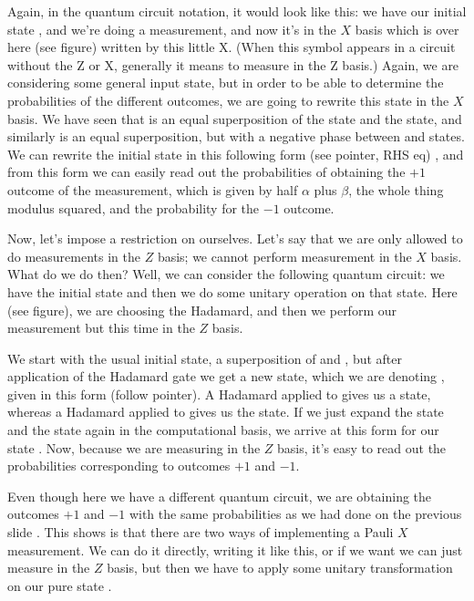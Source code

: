 Again, in the quantum circuit notation, it would look like this: we have our initial state \ket{\psi}, and we're doing a measurement, and now it's in the $X$ basis which is over here (see figure) written by this little X.  (When this symbol appears in a circuit without the Z or X, generally it means to measure in the Z basis.) Again, we are considering some general input state, but in order to be able to determine the probabilities of the different outcomes, we are going to rewrite this state in the $X$ basis. We have seen that  is an equal superposition of the \ket{+} state and the \ket{-} state, and similarly  is an equal superposition, but with a negative phase between \ket{+} and \ket{-} states. We can rewrite the initial state in this following form (see pointer, RHS eq) \rdv{}, and from this form we can easily read out the probabilities of obtaining the  $+1$ outcome of the measurement, which is given by half $\alpha$ plus $\beta$, the whole thing modulus squared, and the probability for the  $-1$ outcome.

Now, let's impose a restriction on ourselves. Let's say that we are only allowed to do measurements in the $Z$ basis; we cannot perform measurement in the $X$ basis.  What do we do then? Well, we can consider the following quantum circuit: we have the initial state and then we do some unitary operation on that state. Here (see figure), we are choosing the Hadamard, and then we perform our measurement but this time in the $Z$ basis.


We start with the usual initial state, a superposition of  and , but after application of the Hadamard gate we get a new state, which we are denoting , given in this form (follow pointer). A Hadamard applied to  gives us a \ket{+} state, whereas a Hadamard applied to  gives us the \ket{-} state. If we just expand the \ket{+} state and the \ket{-} state again in the computational basis, we arrive at this form  for our state \ket{\Psi^+} . Now, because we are measuring in the $Z$ basis, it's easy to read out the probabilities corresponding to outcomes $+1$ and $-1$.

Even though here we have a different quantum circuit, we are obtaining the outcomes $+1$ and $-1$ with the same probabilities as we had done on the previous slide \rdv{}. This shows is that there are two ways of implementing a Pauli $X$ measurement. We can do it directly, writing it like this, or if we want we can just measure in the $Z$ basis, but then we have to apply some unitary transformation on our pure state \ket{\psi}.

